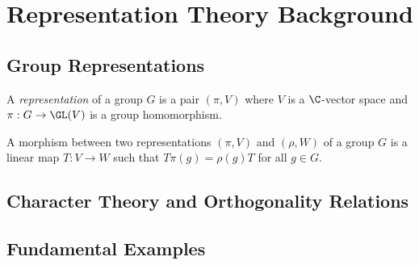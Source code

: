 \documentclass[../main.tex]{subfiles}
\begin{document}
\section{Representation Theory Background}

\subsection{Group Representations}

\begin{definition}
    A \textit{representation} of a group $ G $ is a pair $ (\pi, V) $ where $ V $ is a $ \C $-vector space and $ \pi: G\to \GL(V) $ is a group homomorphism.
\end{definition}

\begin{definition}
    A morphism between two representations $ (\pi, V) $ and $ (\rho, W) $ of a group $ G $ is a linear map $ T:V\to W $ such that $ T \pi(g) = \rho(g) T $ for all $ g\in G $.
\end{definition}



\subsection{Character Theory and Orthogonality Relations}



\subsection{Fundamental Examples}
\end{document}
